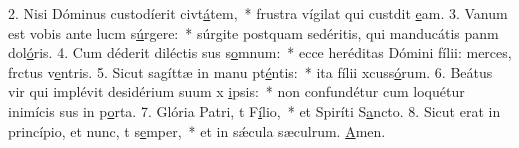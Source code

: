2. Nisi Dóminus custodíerit civt\uline{á}tem,~* frustra vígilat qui custdit \uline{e}am.
3. Vanum est vobis ante lucm s\uline{ú}rgere:~* súrgite postquam sedéritis, qui manducátis panm dol\uline{ó}ris.
4. Cum déderit diléctis sus s\uline{o}mnum:~* ecce heréditas Dómini fílii: merces, frctus v\uline{e}ntris.
5. Sicut sagíttæ in manu pt\uline{é}ntis:~* ita fílii xcuss\uline{ó}rum.
6. Beátus vir qui implévit desidérium suum x \uline{i}psis:~* non confundétur cum loquétur inimícis sus in p\uline{o}rta.
7. Glória Patri, t F\uline{í}lio,~* et Spiríti S\uline{a}ncto.
8. Sicut erat in princípio, et nunc, t s\uline{e}mper,~* et in sǽcula sæculrum. \uline{A}men.
